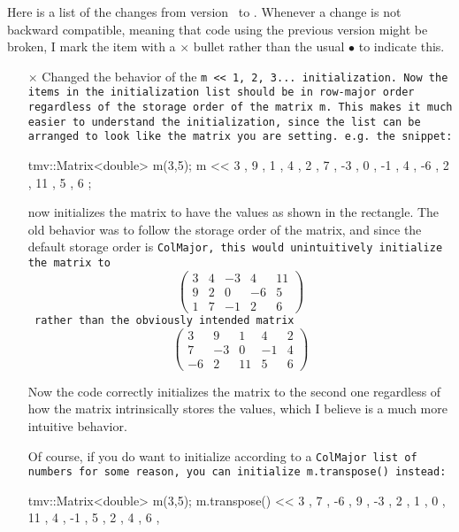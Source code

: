 Here is a list of the changes from version \prevtmvversion\ to \tmvversion.  
Whenever a change is not backward compatible, meaning that code using the previous version might be broken, I mark the item with a $\times$ bullet rather than the usual $\bullet$ to indicate this.  

\begin{itemize}

\item[$\times$] 
Changed the behavior of the \tt{m << 1, 2, 3...} initialization.  Now the items in the initialization list should be in row-major order regardless of the storage order of the matrix \tt{m}.  This makes it much easier to understand the initialization, since the list can be arranged to look like the matrix you are setting.  e.g. the snippet:
\begin{tmvcode}
tmv::Matrix<double> m(3,5);
m << 3 ,  9 ,  1 ,  4 ,  2 ,
     7 , -3 ,  0 , -1 ,  4 ,
    -6 ,  2 , 11 ,  5 ,  6 ;
\end{tmvcode}
now initializes the matrix to have the values as shown in the rectangle.  The old behavior was to follow the storage order of the matrix, and since the default storage order is \tt{ColMajor}, this would unintuitively initialize the matrix to
\begin{equation*}
\left(\begin{array}{ccccc}3 & 4 & -3 & 4 & 11   \\9 & 2 & 0 & -6 & 5   \\1 & 7 & -1 & 2 & 6 \end{array}\right) 
\end{equation*}
rather than the obviously intended matrix
\begin{equation*}
\left(\begin{array}{ccccc}3 & 9 & 1 & 4 & 2   \\7 & -3 & 0 & -1 & 4   \\-6 & 2 & 11 & 5 & 6 \end{array}\right) 
\end{equation*}

Now the code correctly initializes the matrix to the second one regardless of how the matrix intrinsically stores the values, which I believe is a much more intuitive behavior.

Of course, if you do want to initialize according to a \tt{ColMajor} list of numbers for some reason, you can initialize \tt{m.transpose()} instead:
\begin{tmvcode}
tmv::Matrix<double> m(3,5);
m.transpose() << 3 ,  7 , -6 ,
                 9 , -3 ,  2 ,
                 1 ,  0 , 11 ,
                 4 , -1 ,  5 ,
                 2 ,  4 ,  6 ,
\end{tmvcode}


\end{itemize}
